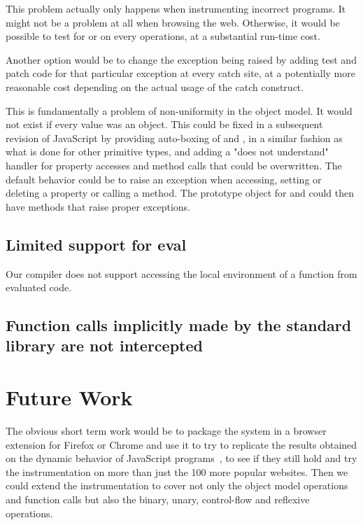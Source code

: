 This problem actually only happens when instrumenting incorrect programs. It
might not be a problem at all when browsing the web. Otherwise, it would be
possible to test for  or  on every operations, at a
substantial run-time cost.

Another option would be to change the exception being raised by adding test and
patch code for that particular exception at every catch site, at a
potentially more reasonable cost depending on the actual usage of the catch
construct.

This is fundamentally a problem of non-uniformity in the object model. It would
not exist if every value was an object.  This could be fixed in a subsequent
revision of JavaScript by providing auto-boxing of  and
, in a similar fashion as what is done for other primitive types,
and adding a "does not understand" handler for property accesses and method
calls that could be overwritten. The default behavior could be to raise an
exception when accessing, setting or deleting a property or calling a method.
The prototype object for  and  could then have methods that
raise proper exceptions.

\subsection{Limited support for eval}

Our compiler does not support accessing the local environment of a function
from evaluated code.

\subsection{Function calls implicitly made by the standard library are not intercepted}
 
\section{Future Work}

The obvious short term work would be to package the system in a browser
extension for Firefox or Chrome and use it to try to replicate the results
obtained on the dynamic behavior of JavaScript programs~\cite{behavior_js}, to
see if they still hold and try the instrumentation on more than just the 100
more popular websites. Then we could extend the instrumentation to cover not
only the object model operations and function calls but also the binary, unary,
control-flow and reflexive operations.

